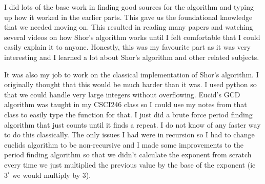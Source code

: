 \documentclass[a4paper]{article}
\begin{document}
I did lots of the base work in finding good sources for the algorithm and typing up how it worked in the earlier parts.
This gave us the foundational knowledge that we needed moving on. This resulted in reading many papers and watching several videos on how Shor's algorithm works until I felt comfortable that I could easily explain it to anyone.
Honestly, this was my favourite part as it was very interesting and I learned a lot about Shor's algorithm and other related subjects.

It was also my job to work on the classical implementation of Shor's algorithm. I originally thought that this would be much harder than it was.
I used python so that we could handle very large integers without overflowing. Eucid's GCD algorithm was taught in my CSCI246 class so I could use my notes from that class to easily type the function for that.
I just did a brute force  period finding algorithm that just counts until it finds a repeat.
I do not know of any faster way to do this classically. The only issues I had were in recursion so I had to change euclids algorithm to be non-recursive and I made some improvements to the period finding algorithm so that we didn't calculate the exponent from scratch every time we just multiplied the previous value by the base of the exponent (ie $3^i$ we would multiply by 3).
\end{document}

